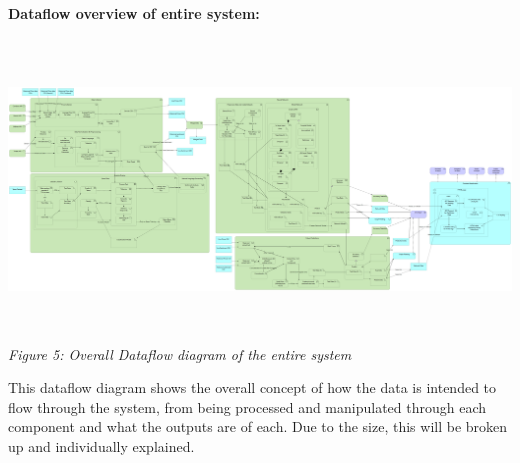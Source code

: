 \documentclass[oneside, 12pt]{article}
\begin{document}
		\textbf{Dataflow overview of entire system:}
		\begin{center}
			\includegraphics[width=18cm,height=8cm]{images/Dataflow.png}
			\textit{Figure 5: Overall Dataflow diagram of the entire system}
		\end{center}
		This dataflow diagram shows the overall concept of how the data is intended to flow through the system, from being processed and manipulated through each component and what the outputs are of each. Due to the size, this will be broken up and individually explained.
		\newpage
		
\end{document}
